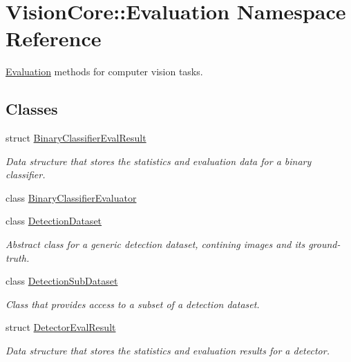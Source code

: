 \hypertarget{namespace_vision_core_1_1_evaluation}{}\section{Vision\+Core\+:\+:Evaluation Namespace Reference}
\label{namespace_vision_core_1_1_evaluation}


\hyperlink{namespace_vision_core_1_1_evaluation}{Evaluation} methods for computer vision tasks.  


\subsection*{Classes}
\begin{DoxyCompactItemize}
\item 
struct \hyperlink{struct_vision_core_1_1_evaluation_1_1_binary_classifier_eval_result}{Binary\+Classifier\+Eval\+Result}
\begin{DoxyCompactList}\small\item\em Data structure that stores the statistics and evaluation data for a binary classifier. \end{DoxyCompactList}\item 
class \hyperlink{class_vision_core_1_1_evaluation_1_1_binary_classifier_evaluator}{Binary\+Classifier\+Evaluator}
\item 
class \hyperlink{class_vision_core_1_1_evaluation_1_1_detection_dataset}{Detection\+Dataset}
\begin{DoxyCompactList}\small\item\em Abstract class for a generic detection dataset, contining images and its ground-\/truth. \end{DoxyCompactList}\item 
class \hyperlink{class_vision_core_1_1_evaluation_1_1_detection_sub_dataset}{Detection\+Sub\+Dataset}
\begin{DoxyCompactList}\small\item\em Class that provides access to a subset of a detection dataset. \end{DoxyCompactList}\item 
struct \hyperlink{struct_vision_core_1_1_evaluation_1_1_detector_eval_result}{Detector\+Eval\+Result}
\begin{DoxyCompactList}\small\item\em Data structure that stores the statistics and evaluation results for a detector. \end{DoxyCompactList}\item 

\end{DoxyCompactItemize}
